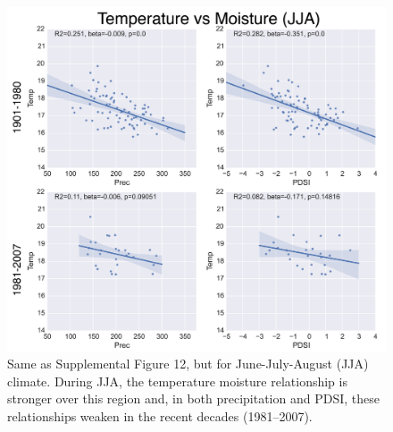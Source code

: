 \documentclass[12pt]{article}
\begin{document}
\begin{figure}
\center
\includegraphics[width=1.0\columnwidth,scale=2]{SUPP_fig_14_temp_vs_moist_JJA.png}
\caption{Same as Supplemental Figure 12, but for June-July-August (JJA) climate. During JJA, the temperature moisture relationship is stronger over this region and, in both precipitation and PDSI, these relationships weaken in the recent decades (1981--2007).}
\end{figure}
\end{document}
